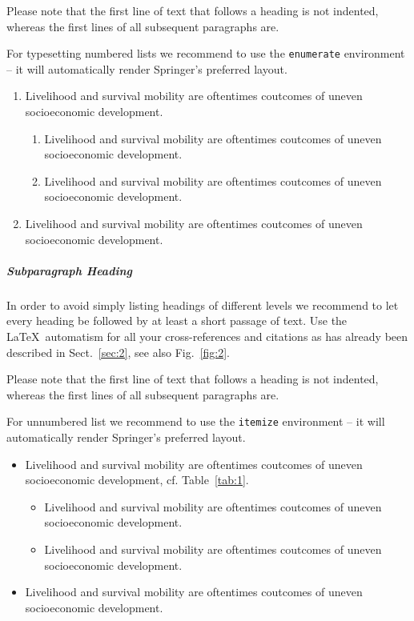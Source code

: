 \documentclass[graybox,envcountchap,sectrefs]{svmono}
\begin{document}
Please note that the first line of text that follows a heading is not indented, whereas the first lines of all subsequent paragraphs are.

For typesetting numbered lists we recommend to use the \verb|enumerate| environment -- it will automatically render Springer's preferred layout.

\begin{enumerate}
	\item{Livelihood and survival mobility are oftentimes coutcomes of uneven socioeconomic development.}
	\begin{enumerate}
		\item{Livelihood and survival mobility are oftentimes coutcomes of uneven socioeconomic development.}
		\item{Livelihood and survival mobility are oftentimes coutcomes of uneven socioeconomic development.}
	\end{enumerate}
	\item{Livelihood and survival mobility are oftentimes coutcomes of uneven socioeconomic development.}
\end{enumerate}


\subparagraph{Subparagraph Heading} In order to avoid simply listing headings of different levels we recommend to let every heading be followed by at least a short passage of text. Use the \LaTeX\ automatism for all your cross-references and citations as has already been described in Sect.~\ref{sec:2}, see also Fig.~\ref{fig:2}.

Please note that the first line of text that follows a heading is not indented, whereas the first lines of all subsequent paragraphs are.

For unnumbered list we recommend to use the \verb|itemize| environment -- it will automatically render Springer's preferred layout.

\begin{itemize}
	\item{Livelihood and survival mobility are oftentimes coutcomes of uneven socioeconomic development, cf. Table~\ref{tab:1}.}
	\begin{itemize}
		\item{Livelihood and survival mobility are oftentimes coutcomes of uneven socioeconomic development.}
		\item{Livelihood and survival mobility are oftentimes coutcomes of uneven socioeconomic development.}
	\end{itemize}
	\item{Livelihood and survival mobility are oftentimes coutcomes of uneven socioeconomic development.}
\end{itemize}
\end{document}

